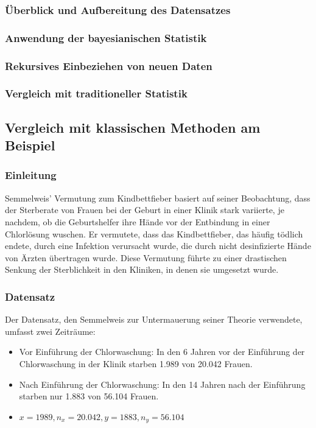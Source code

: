\documentclass[a4paper,12pt]{article}
\begin{document}
\subsubsection{Überblick und Aufbereitung des Datensatzes}
\newpage

\subsubsection{Anwendung der bayesianischen Statistik}
\newpage

\subsubsection{Rekursives Einbeziehen von neuen Daten}
\newpage

\subsubsection{Vergleich mit traditioneller Statistik}

\subsection{Vergleich mit klassischen Methoden am Beispiel}

\subsubsection{Einleitung}
Semmelweis' Vermutung zum Kindbettfieber basiert auf seiner Beobachtung, dass der Sterberate von Frauen bei der Geburt 
in einer Klinik stark variierte, je nachdem, ob die Geburtshelfer ihre Hände vor der Entbindung in einer Chlorlösung wuschen. 
Er vermutete, dass das Kindbettfieber, das häufig tödlich endete, durch eine Infektion verursacht wurde, 
die durch nicht desinfizierte Hände von Ärzten übertragen wurde. Diese Vermutung führte zu einer 
drastischen Senkung der Sterblichkeit in den Kliniken, in denen sie umgesetzt wurde.
\parencite[3]{StatistikKlassischOderBayes}

\subsubsection{Datensatz}
Der Datensatz, den Semmelweis zur Untermauerung seiner Theorie verwendete, umfasst zwei Zeiträume: 
\begin{itemize}
    \item Vor Einführung der Chlorwaschung: In den 6 Jahren vor der Einführung der Chlorwaschung in der Klinik starben 1.989 von 20.042 Frauen.
    \item Nach Einführung der Chlorwaschung: In den 14 Jahren nach der Einführung starben nur 1.883 von 56.104 Frauen.
    \item $x = 1989, n_x = 20.042, y = 1883, n_y = 56.104$
\end{itemize}
\end{document}
